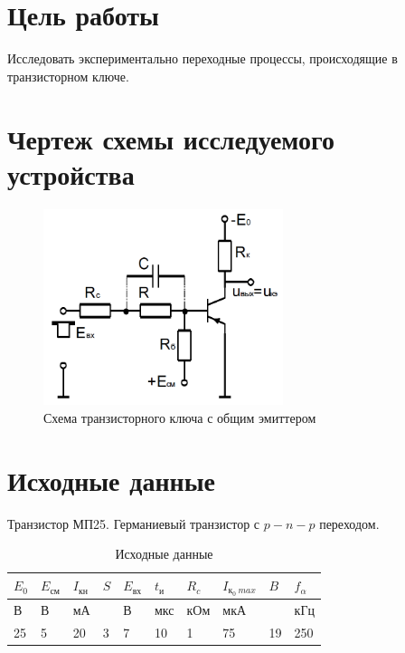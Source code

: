 





\section{Цель работы}

Исследовать экспериментально переходные процессы, происходящие в транзисторном ключе.

\section{Чертеж схемы исследуемого устройства}

\begin{figure}[H]
	\begin{center}
	\vspace{-0.5cm}
		\includegraphics[width=7cm]{img/scheme}
		\caption{Схема транзисторного ключа с общим эмиттером}
		\label{figure:1}
	\vspace{-0.5cm}
	\end{center}
\end{figure}

\section{Исходные данные}

Транзистор МП25. Германиевый транзистор с $p-n-p$ переходом.

\begin{table}[H]
	\begin{center}
	\caption{Исходные данные}
	\def\arraystretch{1.4}
		\begin{tabularx}{\textwidth}{|X|X|X|X|X|X|X|X|X|X|}
			\hline
			$E_0$ &
			$E_\text{см}$ &
			$I_\text{кн}$ &
			$S$ &
			$E_\text{вх}$ &
			$t_\text{и}$ &
			$R_c$ &
			$I_{\text{к}_0\ max}$ &
			$B$ &
			$f_\alpha$\\
			\hline
			В &
			В &
			мА &
			 &
			В &
			мкс &
			кОм &
			мкА &
			 &
			кГц\\
			\hline
			25 &
			5 &
			20 &
			3 &
			7 &
			10 &
			1 &
			75 &
			19 &
			250 \\
		    \hline	
		\end{tabularx}
		\label{tabular:1}
	\end{center}
\end{table}

